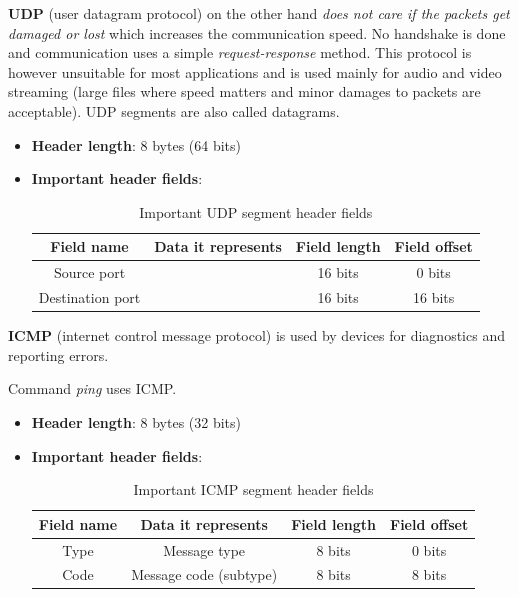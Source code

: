 \documentclass[a4paper]{article}
\begin{document}
  \vspace{1cm}


  \textbf{UDP} (user datagram protocol) on the other hand 
  \textit{does not care if the packets get damaged or lost} which increases
  the communication speed. No handshake is done and communication uses a simple
  \textit{request-response} method. This protocol is however unsuitable for most 
  applications and is used mainly for audio and video streaming (large files
  where speed matters and minor damages to packets are acceptable).
  UDP segments are also called datagrams.

  \begin{itemize}
    \item \textbf{Header length}: 8 bytes (64 bits)
    \item \textbf{Important header fields}:
      \begin{table}[h]
        \centering
        \begin{tabular}{|c|c|c|c|}
          \hline
          Field name & Data it represents & Field length & Field offset \\
          \hline
          \hline
          Source port & & 16 bits & 0 bits \\
          \hline
          Destination port & & 16 bits & 16 bits \\
          \hline
        \end{tabular}
        \caption{Important UDP segment header fields}
      \end{table}
  \end{itemize}

  \vspace{1cm}


  \textbf{ICMP} (internet control message protocol) is used by devices for
  diagnostics and reporting errors.

  \begin{notes}
    \item Command \textit{ping} uses ICMP.
  \end{notes}

  \begin{itemize}
    \item \textbf{Header length}: 8 bytes (32 bits)
    \item \textbf{Important header fields}:
      \begin{table}[h]
        \centering
        \begin{tabular}{|c|c|c|c|}
          \hline
          Field name & Data it represents & Field length & Field offset \\
          \hline
          \hline
          Type & Message type & 8 bits & 0 bits \\
          \hline
          Code & Message code (subtype) & 8 bits & 8 bits \\
          \hline
        \end{tabular}
        \caption{Important ICMP segment header fields}
      \end{table}
  \end{itemize}
\end{document}
